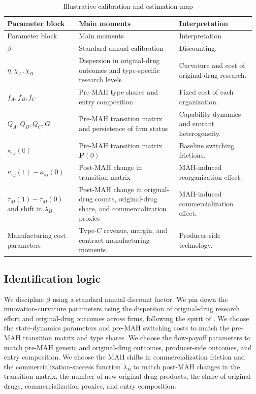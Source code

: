 \documentclass[12pt]{article}
\newcommand{\1}{\mathbf{1}}
\begin{document}
\begin{longtable}{p{}p{}p{}}
\caption{Illustrative calibration and estimation map}\label{tab:calibration}\\
\toprule
Parameter block & Main moments & Interpretation \\
\midrule
\endfirsthead
\toprule
Parameter block & Main moments & Interpretation \\
\midrule
\endhead
$\beta$ & Standard annual calibration & Discounting. \\
$\eta,\chi_A,\chi_B$ & Dispersion in original-drug outcomes and type-specific research levels & Curvature and cost of original-drug research. \\
$f_A,f_B,f_C$ & Pre-MAH type shares and entry composition & Fixed cost of each organization. \\
$Q_A,Q_B,Q_C,G$ & Pre-MAH transition matrix and persistence of firm status & Capability dynamics and entrant heterogeneity. \\
$\kappa_{sj}(0)$ & Pre-MAH transition matrix $\mathbf P(0)$ & Baseline switching frictions. \\
$\kappa_{sj}(1)-\kappa_{sj}(0)$ & Post-MAH change in transition matrix & MAH-induced reorganization effect. \\
$\tau_M(1)-\tau_M(0)$ and shift in $\lambda_B$ & Post-MAH change in original-drug counts, original-drug share, and commercialization proxies & MAH-induced commercialization effect. \\
Manufacturing cost parameters & Type-$C$ revenue, margin, and contract-manufacturing moments & Producer-side technology. \\
\bottomrule
\end{longtable}

\subsection{Identification logic}

We discipline $\beta$ using a standard annual discount factor. We pin down the innovation-curvature parameters using the dispersion of original-drug research effort and original-drug outcomes across firms, following the spirit of \citet{KletteKortum2004}. We choose the state-dynamics parameters and pre-MAH switching costs to match the pre-MAH transition matrix and type shares. We choose the flow-payoff parameters to match pre-MAH generic and original-drug outcomes, producer-side outcomes, and entry composition. We choose the MAH shifts in commercialization friction and the commercialization-success function $\lambda_B$ to match post-MAH changes in the transition matrix, the number of new original-drug products, the share of original drugs, commercialization proxies, and entry composition.
\end{document}
